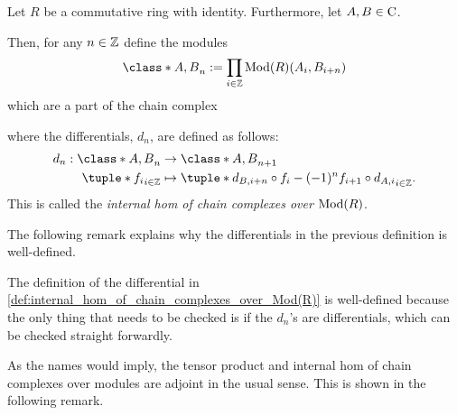 \begin{definition}
    \label{def:internal_hom_of_chain_complexes_over_Mod(R)}
    Let \( R \) be a commutative ring with identity. Furthermore, let \( A, B \in \operatorname{C} \).

    Then, for any \( n \in {\mathbb{Z}} \) define the modules
    \[
        \class*{A, B}_n := \prod_{i \in \Zb} \Mod(R)(A_i, B_{i + n})
    \]
    which are a part of the chain complex
    \begin{center}
    \end{center}

    where the differentials, \( d_n \), are defined as follows:
    \begin{align*}
        d_n : \class*{A, B}_n &\to \class*{A, B}_{n + 1} \\
        \tuple*{f_i}_{i \in \Zb} &\mapsto \tuple*{d_{B, i + n} \circ f_i - (-1)^n f_{i + 1} \circ d_{A, i}}_{i \in \Zb}.
    \end{align*}
    This is called the \emph{internal hom of chain complexes over \( \operatorname{Mod}(R) \)}.
\end{definition}

The following remark explains why the differentials in the previous definition is well-defined.

\begin{remark}
    The definition of the differential in \autoref{def:internal_hom_of_chain_complexes_over_Mod(R)} is well-defined because the only thing that needs to be checked is if the \( d_n \)'s are differentials, which can be checked straight forwardly.
\end{remark}

As the names would imply, the tensor product and internal hom of chain complexes over modules are adjoint in the usual sense. This is shown in the following remark.

